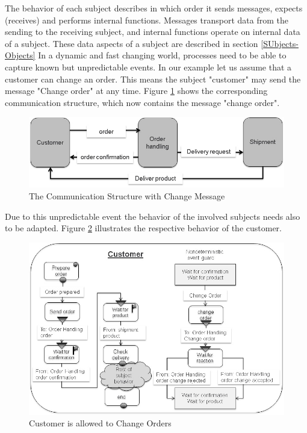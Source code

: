 The behavior of each subject describes in which order it sends messages, expects (receives) and performs internal functions. Messages transport data from the sending to the receiving subject, and internal functions operate on internal data of a subject. These data aspects of a subject are described in section \ref{SUbjects-Objects} In a dynamic and fast changing world, processes need to  be able to capture known but unpredictable events. In our example let us assume that a customer can change an order. This means the subject "customer" may send the message "Change order" at any time. Figure \ref{fig:ordercomstructure} shows the corresponding communication structure, which now contains the message "change order".
\newpage
\begin{figure}[ph]
	\centering
	\includegraphics[width=0.7\linewidth]{20181026-Ontologie-Bilder/Grafiken-Ontologie/SUbjectExecution/OrderComStructure}
	\caption[The Communication Structure with Change Message]{The Communication Structure with Change Message}
	\label{fig:ordercomstructure}
\end{figure}

Due to this unpredictable event the behavior of the involved subjects needs also to be adapted. Figure \ref{fig:ordercustomerchange} illustrates the respective behavior of the customer. 

\begin{figure}[ph]
	\centering
	\includegraphics[width=0.7\linewidth]{20181026-Ontologie-Bilder/Grafiken-Ontologie/SUbjectExecution/OrderCustomerChange}
	\caption[Customer is allowed to Change Orders]{Customer is allowed to Change Orders}
	\label{fig:ordercustomerchange}
\end{figure}



